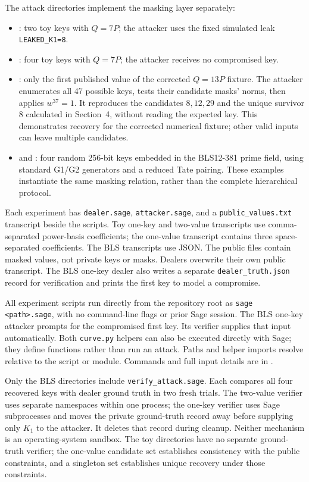 \documentclass[11pt]{article}
\begin{document}
The attack directories implement the masking layer separately:
\begin{itemize}
    \item {}: two toy keys with $Q=7P$;
    the attacker uses the fixed simulated leak \texttt{LEAKED\_K1=8}.
    \item {}: four toy keys with $Q=7P$;
    the attacker receives no compromised key.
    \item {}: only the first published value of the
    corrected $Q=13P$ fixture. The attacker enumerates all 47 possible
    keys, tests their candidate masks' norms, then applies $w^{37}=1$.
    It reproduces the candidates $8,12,29$ and the unique survivor $8$
    calculated in Section~4, without reading the expected key.
    This demonstrates recovery for the corrected numerical fixture;
    other valid inputs can leave multiple candidates.
    \item {} and
    : four random 256-bit keys embedded
    in the BLS12-381 prime field, using standard G1/G2 generators and a
    reduced Tate pairing. These examples instantiate the same masking
    relation, rather than the complete hierarchical protocol.
\end{itemize}

Each experiment has \texttt{dealer.sage}, \texttt{attacker.sage}, and a
\texttt{public\_values.txt} transcript beside the scripts. Toy one-key and
two-value transcripts use comma-separated power-basis coefficients;
the one-value transcript contains three space-separated coefficients.
The BLS transcripts use JSON. The public files contain masked values,
not private keys or masks. Dealers overwrite their own public transcript.
The BLS one-key dealer also writes a separate \texttt{dealer\_truth.json}
record for verification and prints the first key to model a compromise.

All experiment scripts run directly from the repository root as
\texttt{sage <path>.sage}, with no command-line flags or prior Sage session.
The BLS one-key attacker prompts for the compromised first key. Its verifier
supplies that input automatically. Both \texttt{curve.py} helpers can also
be executed directly with Sage; they define functions rather than run an
attack. Paths and helper imports resolve relative to the script or module.
Commands and full input details are in .

Only the BLS directories include \texttt{verify\_attack.sage}. Each compares
all four recovered keys with dealer ground truth in two fresh trials.
The two-value verifier uses separate namespaces within one process; the
one-key verifier uses Sage subprocesses and moves the private ground-truth
record away before supplying only $K_1$ to the attacker. It deletes that
record during cleanup. Neither mechanism is an operating-system sandbox.
The toy directories have no separate ground-truth verifier; the one-value
candidate set establishes consistency with the public constraints, and a
singleton set establishes unique recovery under those constraints.
\end{document}
